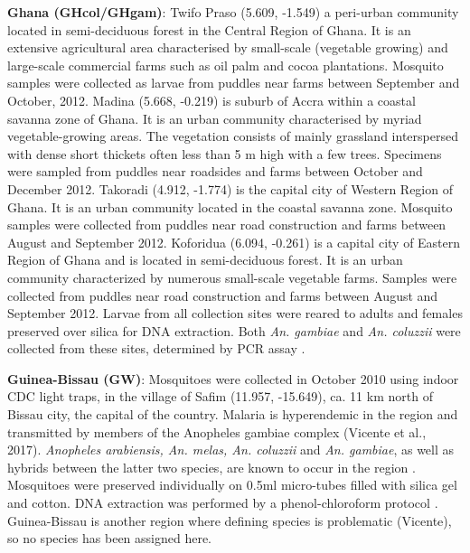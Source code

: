 \documentclass[a4paper,11pt,abstracton,hidelinks]{scrartcl}
\begin{document}
%
\textbf{Ghana (GHcol/GHgam)}: Twifo Praso (5.609, -1.549) a peri-urban community located in semi-deciduous forest in the Central Region of Ghana.
%
It is an extensive agricultural area characterised by small-scale (vegetable growing) and large-scale commercial farms such as oil palm and cocoa plantations.
%
Mosquito samples were collected as larvae from puddles near farms between September and October, 2012.
%
Madina (5.668,	-0.219) is suburb of Accra within a coastal savanna zone of Ghana. 
%
It is an urban community characterised by myriad vegetable-growing areas.
%
The vegetation consists of mainly grassland interspersed with dense short thickets often less than 5 m high with a few trees.
%
Specimens were sampled from puddles near roadsides and farms between October and December 2012.
%
Takoradi (4.912, -1.774) is the capital city of Western Region of Ghana.
%
It is an urban community located in the coastal savanna zone.
%
Mosquito samples were collected from puddles near road construction and farms between August and September 2012.
%
Koforidua (6.094, -0.261) is a capital city of Eastern Region of Ghana and is located in semi-deciduous forest. 
%
It is an urban community characterized by numerous small-scale vegetable farms. 
%
Samples were collected from puddles near road construction and farms between August and September 2012.
%
Larvae from all collection sites were reared to adults and females preserved over silica for DNA extraction.
%
Both \textit{An. gambiae} and \textit{An. coluzzii} were collected from these sites, determined by PCR assay \cite{santolamazza2008}.

%
\textbf{Guinea-Bissau (GW)}: Mosquitoes were collected in October 2010 using indoor CDC light traps, in the village of Safim (11.957, -15.649), ca. 11 km north of Bissau city, the capital of the country.
%
Malaria is hyperendemic in the region and transmitted by members of the Anopheles gambiae complex (Vicente et al., 2017).
%
\textit{Anopheles arabiensis, An. melas, An. coluzzii} and \textit{An. gambiae}, as well as hybrids between the latter two species, are known to occur in the region \cite{Gordicho2014, Vicente2017}.
%
Mosquitoes were preserved individually on 0.5ml micro-tubes filled with silica gel and cotton. DNA extraction was performed by a phenol-chloroform protocol \cite{Donnelly1999}.
%
Guinea-Bissau is another region where defining species is problematic (Vicente), so no species has been assigned here.


\end{document}

